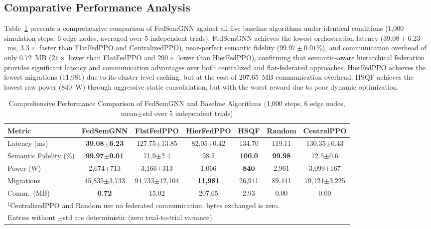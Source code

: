 \documentclass[conference]{IEEEtran}
\begin{document}
	
	\subsection{Comparative Performance Analysis}
	Table~\ref{tab:performance_comparison} presents a comprehensive comparison of FedSemGNN against all five baseline algorithms under identical conditions (1{,}000 simulation steps, 6 edge nodes, averaged over 5 independent trials). FedSemGNN achieves the lowest orchestration latency ($39.08\pm6.23$~ms, $3.3\times$ faster than FlatFedPPO and CentralizedPPO), near-perfect semantic fidelity ($99.97\pm0.01$\%), and communication overhead of only 0.72~MB ($21\times$ lower than FlatFedPPO and $290\times$ lower than HierFedPPO), confirming that semantic-aware hierarchical federation provides significant latency and communication advantages over both centralized and flat-federated approaches. HierFedPPO achieves the fewest migrations (11{,}981) due to its cluster-level caching, but at the cost of $207.65$~MB communication overhead. HSQF achieves the lowest raw power (840~W) through aggressive static consolidation, but with the worst reward due to poor dynamic optimization.

	\begin{table}[htbp]
		\centering
		\caption{Comprehensive Performance Comparison of FedSemGNN and Baseline Algorithms (1{,}000 steps, 6 edge nodes, mean$\pm$std over 5 independent trials)}
		\label{tab:performance_comparison}
		\small
		\begin{tabular}{lcccccc}
			\toprule
			\textbf{Metric} & \textbf{FedSemGNN} & \textbf{FlatFedPPO} & \textbf{HierFedPPO} & \textbf{HSQF} & \textbf{Random} & \textbf{CentralPPO} \\
			\midrule
			Latency (ms) & \textbf{39.08$\pm$6.23} & 127.75$\pm$13.85 & 82.05$\pm$0.42 & 134.70 & 119.11 & 130.35$\pm$0.43 \\
			Semantic Fidelity (\%) & \textbf{99.97$\pm$0.01} & 71.9$\pm$2.4 & 98.5 & \textbf{100.0} & \textbf{99.98} & 72.5$\pm$0.6 \\
			Power (W) & 2{,}674$\pm$713 & 3{,}166$\pm$313 & 1{,}066 & \textbf{840} & 2{,}961 & 3{,}099$\pm$167 \\
			Migrations & 45{,}835$\pm$3{,}733 & 94{,}733$\pm$12{,}104 & \textbf{11{,}981} & 26{,}941 & 89{,}441 & 79{,}124$\pm$3{,}225 \\
			Comm.\ (MB) & \textbf{0.72} & 15.02 & 207.65 & 2.93 & 0.00 & 0.00 \\
			\bottomrule
			\multicolumn{7}{l}{\footnotesize $^\ddagger$CentralizedPPO and Random use no federated communication; bytes exchanged is zero.}\\
			\multicolumn{7}{l}{\footnotesize Entries without $\pm$std are deterministic (zero trial-to-trial variance).}\\
		\end{tabular}
	\end{table}
\end{document}
